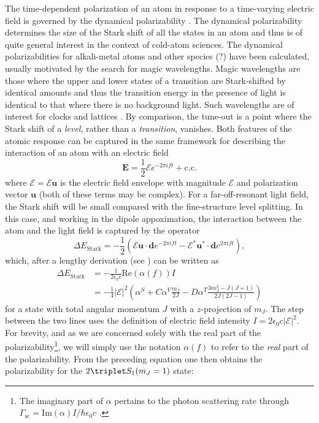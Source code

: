 	The time-dependent polarization of an atom in response to a time-varying electric field is governed by the dynamical polarizability \cite{LeKien13,etc}.
	The dynamical polarizability determines the size of the Stark shift of all the states in an atom and thus is of quite general interest in the context of cold-atom sciences.
	The dynamical polarizabilities for alkali-metal atoms and other species (?) have been calculated, usually motivated by the search for magic wavelengths.
	Magic wavelengths are those where the upper and lower states of a transition are Stark-shifted by identical amounts and thus the transition energy in the presence of light is identical to that where there is no background light.
	Such wavelengths are of interest for clocks and lattices \cite{somepapers}.
	By comparison, the tune-out is a point where the Stark shift of a \emph{level}, rather than a \emph{transition}, vanishes. 
	Both features of the atomic response can be captured in the same framework for describing the interaction of an atom with an electric field
	\begin{equation}
		\mathbf{E} = \frac{1}{2}\mathbf{\mathcal{E}}e^{-2\pi i f t}+\mathrm{c.c.}
	\end{equation}
	where $\mathbf{\mathcal{E}}=\mathcal{E}\mathbf{u}$ is the electric field envelope with magnitude $\mathcal{E}$ and polarization vector $\mathbf{u}$ (both of these terms may be complex).
	For a far-off-resonant light field, the Stark shift will be small compared with the fine-structure level splitting. 
	In this case, and working in the dipole appoximation, the interaction between the atom and the light field is captured by the operator
	\begin{equation}
		\Delta E_\mathrm{Stark} = -\frac{1}{2}\left(\mathcal{E}\mathbf{u}\cdot\mathbf{d}e^{-2\pi i f t} - \mathcal{E}^*\mathbf{u}^*\cdot\mathbf{d}e^{2\pi i f t}\right),
	\end{equation}
	which, after a lengthy derivation (see \cite{LeKien13}) can be written as
	\begin{align}
		\Delta E_\mathrm{Stark} &= -\frac{1}{2\epsilon_0 c} \mathrm{Re}(\alpha(f)) I\\
		&=-\frac{1}{4}|\mathbf{\mathcal{E}}|^2\left(\alpha^S + C\alpha^V \frac{m_J}{2J} - D\alpha^T\frac{3m_{J}^{2}-J(J+1)}{2J(2J-1)}\right)
	\end{align}
	 for a state with total angular momentum $J$ with a $z$-projection of $m_J$. The step between the two lines uses the definition of electric field intensity $I = 2\epsilon_0 c|\mathcal{E}|^2$. For brevity, and as we are concerned solely with the real part of the polarizability\footnote{The imaginary part of $\alpha$ pertains to the photon scattering rate through $\Gamma_\mathrm{sc} = \mathrm{Im}(\alpha)I/\hbar\epsilon_0 c$ \cite{LeKien13,Grimm00}.}, we will simply use the notation $\alpha(f)$ to refer to the \emph{real} part of the polarizability. From the preceding equation one then obtains the polarizability for the $2\triplet S_1(m_J=1)$ state:
